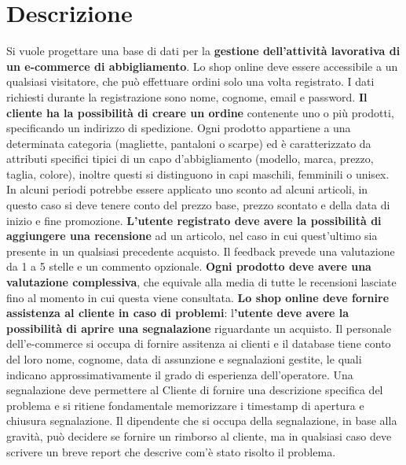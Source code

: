 \section{Descrizione}

Si vuole progettare una base di dati per la\textbf{ gestione dell'attività lavorativa di un e-commerce di abbigliamento}. Lo shop online deve essere accessibile a un qualsiasi visitatore, che può effettuare ordini solo una volta registrato. I dati richiesti durante la registrazione sono nome, cognome, email e password. \textbf{Il cliente ha la possibilità di creare un ordine} contenente uno o più prodotti, specificando un indirizzo di spedizione. Ogni prodotto appartiene a una determinata categoria (magliette, pantaloni o scarpe) ed è caratterizzato da attributi specifici tipici di un capo d'abbigliamento (modello, marca, prezzo, taglia, colore), inoltre questi si distinguono in capi maschili, femminili o unisex. In alcuni periodi potrebbe essere applicato uno sconto ad alcuni articoli, in questo caso si deve tenere conto del prezzo base, prezzo scontato e della data di inizio e fine promozione.
\textbf{L'utente registrato deve avere la possibilità di aggiungere una recensione} ad un articolo, nel caso in cui quest'ultimo sia presente in un qualsiasi precedente acquisto. Il feedback prevede una valutazione da 1 a 5 stelle e un commento opzionale. \textbf{Ogni prodotto deve avere una valutazione complessiva}, che equivale alla media di tutte le recensioni lasciate fino al momento in cui questa viene consultata.
\textbf{Lo shop online deve fornire assistenza al cliente in caso di problemi}: l\textbf{'utente deve avere la possibilità di aprire una segnalazione} riguardante un acquisto. Il personale dell'e-commerce si occupa di fornire assitenza ai clienti e il database tiene conto del loro nome, cognome, data di assunzione e segnalazioni gestite, le quali indicano approssimativamente il grado di esperienza dell'operatore. Una segnalazione deve permettere al Cliente di fornire una descrizione specifica del problema e si ritiene fondamentale memorizzare i timestamp di apertura e chiusura segnalazione. Il dipendente che si occupa della segnalazione, in base alla gravità, può decidere se fornire un rimborso al cliente, ma in qualsiasi caso deve scrivere un breve report che descrive com'è stato risolto il problema.
\newpage
